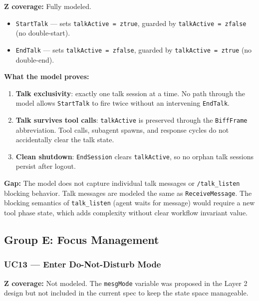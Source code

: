 \documentclass[a4paper,10pt,fleqn]{article}
\begin{document}
\textbf{Z coverage:} Fully modeled.

\begin{itemize}
  \item \texttt{StartTalk} --- sets \texttt{talkActive = ztrue},
    guarded by \texttt{talkActive = zfalse} (no double-start).
  \item \texttt{EndTalk} --- sets \texttt{talkActive = zfalse},
    guarded by \texttt{talkActive = ztrue} (no double-end).
\end{itemize}

\textbf{What the model proves:}

\begin{enumerate}
  \item \textbf{Talk exclusivity}: exactly one talk session at a time.
    No path through the model allows \texttt{StartTalk} to fire twice
    without an intervening \texttt{EndTalk}.
  \item \textbf{Talk survives tool calls}: \texttt{talkActive} is
    preserved through the \texttt{BiffFrame} abbreviation. Tool calls,
    subagent spawns, and response cycles do not accidentally clear the
    talk state.
  \item \textbf{Clean shutdown}: \texttt{EndSession} clears
    \texttt{talkActive}, so no orphan talk sessions persist after logout.
\end{enumerate}

\textbf{Gap:} The model does not capture individual talk messages or
\texttt{/talk\_listen} blocking behavior. Talk messages are modeled the
same as \texttt{ReceiveMessage}. The blocking semantics of
\texttt{talk\_listen} (agent waits for message) would require a new tool
phase state, which adds complexity without clear workflow invariant value.

\subsection{Group E: Focus Management}

\subsubsection{UC13 --- Enter Do-Not-Disturb Mode}

\textbf{Z coverage:} Not modeled. The \texttt{mesgMode} variable was
proposed in the Layer 2 design but not included in the current spec to
keep the state space manageable.
\end{document}
